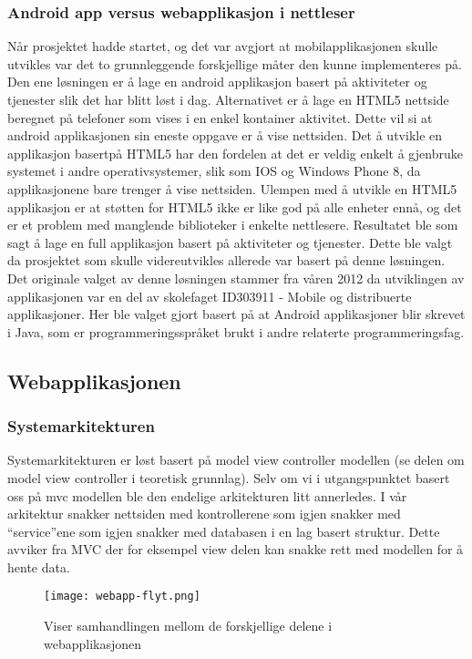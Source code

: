 \documentclass[../main.tex]{subfiles}
\begin{document}
\subsubsection{Android app versus webapplikasjon i nettleser}
Når prosjektet hadde startet, og det var avgjort at mobilapplikasjonen skulle utvikles var det to grunnleggende forskjellige måter den kunne implementeres på. Den ene løsningen er å lage en android applikasjon basert på aktiviteter og tjenester slik det har blitt løst i dag. Alternativet er å lage en HTML5 nettside beregnet på telefoner som vises i en enkel kontainer aktivitet. Dette vil si at android applikasjonen sin eneste oppgave er å vise nettsiden.\newline
Det å utvikle en applikasjon basertpå HTML5 har den fordelen at det er veldig enkelt å gjenbruke systemet i andre operativsystemer, slik som IOS og Windows Phone 8, da applikasjonene bare trenger å vise nettsiden. Ulempen med å utvikle en HTML5 applikasjon er at støtten for HTML5 ikke er like god på alle enheter ennå, og det er et problem med manglende biblioteker i enkelte nettlesere.\newline
Resultatet ble som sagt å lage en full applikasjon basert på aktiviteter og tjenester. Dette ble valgt da prosjektet som skulle videreutvikles allerede var basert på denne løsningen. Det originale valget av denne løsningen stammer fra våren 2012 da utviklingen av applikasjonen var en del av skolefaget ID303911 - Mobile og distribuerte applikasjoner. Her ble valget gjort basert på at Android applikasjoner blir skrevet i Java, som er programmeringsspråket brukt i andre relaterte programmeringsfag.

\subsection{Webapplikasjonen}

\subsubsection{Systemarkitekturen}
Systemarkitekturen er løst basert på model view controller modellen (se delen om model view controller i teoretisk grunnlag). Selv om vi i utgangspunktet basert oss på mvc modellen ble den endelige arkitekturen litt annerledes. I vår arkitektur snakker nettsiden med kontrollerene som igjen snakker med “service”ene som igjen snakker med databasen i en lag basert struktur. Dette avviker fra MVC der for eksempel view delen kan snakke rett med modellen for å hente data.
\begin{figure}[H]
  \centering
  \texttt{[image: webapp-flyt.png]}
  \caption{Viser samhandlingen mellom de forskjellige delene i webapplikasjonen}
\end{figure}
\end{document}
